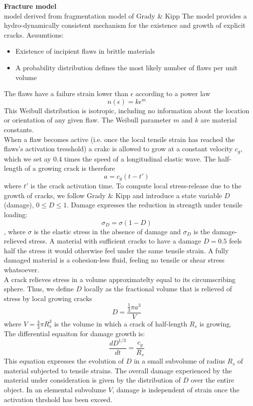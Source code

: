\documentclass[12pt]{book}
\begin{document}
\textbf{Fracture model\\}
model derived from fragmentation model of Grady \& Kipp
The model provides a hydro-dynamically consistent mechanism for the existence and growth of explicit cracks.
Asuumtions:
\begin{itemize}
\item Existence of incipient flaws in brittle materials
\item A probability distribution defines the most likely number of flaws per unit volume
\end{itemize}
The flaws have a failure strain lower than $\epsilon$ according to a power law 
\[n(\epsilon)=k\epsilon^m\]
This Weibull distribution is isotropic, including no information about the location or orientation of any given flaw. The Weibull parameter $m$ and $k$ are material constants.\\
When a flaw becomes active (i.e. once the local tensile strain has reached the flaws's activation tresshold) a crakc is allowed to grow at a constant velocity $c_g$, which we set ay $0.4$ times the speed of a longitudinal elastic wave. The half-length of a growing crack is therefore
\[a=c_g(t-t')\]
where $t'$ is the crack activation time.
To compute local stress-release due to the growth of cracks, we follow Grady \& Kipp and introduce a state variable $D$ (damage), $0\leq D\leq 1$. Damage expresses the reduction in strength under tensile loading:
\[\sigma_D=\sigma(1-D)\],
where $\sigma$ is the elastic stress in the absence of damage and $\sigma_D$ is the damage-relieved stress. A material with sufficient cracks to have a damage $D=0.5$ feels half the stress it would otherwise feel under the same tensile strain. A fully damaged material is a cohesion-less fluid, feeling no tensile or shear stress whatsoever.\\
A crack relieves stress in a volume approximatelty equal to its circumscribing sphere. Thus, we define $D$ locally as the fractional volume that is relieved of stress by local growing cracks
\[D=\frac{\frac{1}{3}\pi a^3}{V}\]
where $V=\frac{4}{3}\pi R_s^3$ is the volume in which a crack of half-length $R_s$ is growing.\\
The differential equaiton for damage growth is:
\[\frac{dD^{1/3}}{dt}=\frac{c_g}{R_s}\]
This equation expresses the evolution of $D$ in a small subvolume of radius $R_s$ of material subjected to tensile strains. The overall damage experienced by the material under consideration is given by the distribution of $D$ over the entire object. In an elemental subvolume $V$, damage is independent of strain once the activation thrshold has been exceed.



\end{document}
